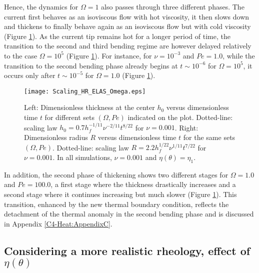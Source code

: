 Hence, the dynamics for $\Omega=1$ also passes through three different
phases.   The current  first behaves  as an  isoviscous flow  with hot
viscosity, it then slows down and  thickens to finally behave again as
an    isoviscous    flow    but   with    cold    viscosity    (Figure
\ref{C4-Scaling_HR_ELAS_Omega}).  As the current tip remains hot for a
longer  period of  time,  the  transition to  the  second and  third
bending   regime  are   however   delayed  relatively   to  the   case
$\Omega= 10^5$ (Figure \ref{C4-Scaling_HR_ELAS_Omega}).  For instance,
for $\nu=10^{-3}$  and $Pe=1.0$, while  the transition to  the second
bending phase  already begins at $t\sim  10^{-6}$ for $\Omega=10^{5}$,
it  occurs  only  after  $t\sim 10^{-5}$  for  $\Omega=  1.0$  (Figure
\ref{C4-Scaling_HR_ELAS_Omega}).

\begin{figure}[h!]
  \begin{center}
    \graphicspath{ {/Users/thorey/Documents/These/Projet/Refroidissement/Skin_Model/Figure/Figure_Heating/} }
    \texttt{[image: Scaling\_HR\_ELAS\_Omega.eps]}
    \caption{Left: Dimensionless thickness at  the center $h_0$ versus
      dimensionless   time  $t$   for  different   sets  $(\Omega,Pe)$
      indicated    on   the    plot.     Dotted-line:   scaling    law
      $h_0=   0.7h_f^{-1/11}\nu^{-2/11}t^{8/22}$    for   $\nu=0.001$.
      Right: Dimensionless  radius $R$  versus dimensionless  time $t$
      for  the  same  sets $(\Omega,Pe)$.   Dotted-line:  scaling  law
      $R= 2.2h_f^{1/22}\nu^{1/11}t^{7/22}$ for $\nu  = 0.001$. In  all
      simulations, $\nu=0.001$ and $\eta(\theta)=\eta_1$.}
    \label{C4-Scaling_HR_ELAS_Omega}
  \end{center}
\end{figure}

In addition, the second phase  of thickening shows two different stages
for $\Omega =  1.0$ and $Pe=100.0$, a first stage  where the thickness
drastically increases and a second stage where it continues increasing
but   much  slower   (Figure  \ref{C4-Scaling_HR_ELAS_Omega}).    This
transition, enhanced  by the new thermal  boundary condition, reflects
the detachment of the thermal anomaly  in the second bending phase and
is discussed in Appendix \ref{C4-Heat:AppendixC}.

\subsection{Considering   a  more   realistic   rheology,  effect   of
  $\eta(\theta)$}
\label{C4-sec:infl-therm-bound-el}


